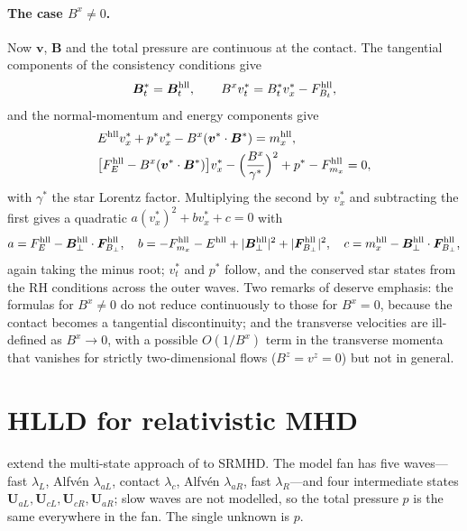 \documentclass[11pt,a4paper,oneside,openany]{book}
\newcommand{\textcite}{\citet}
\newcommand{\parencite}{\citep}
\theoremstyle{definition}
\theoremstyle{plain}
\theoremstyle{remark}
\newcommand{\vv}{\bm{v}}
\newcommand{\BB}{\bm{B}}
\newcommand{\UU}{\bm{U}}
\newcommand{\FF}{\bm{F}}
\begin{document}
\paragraph{The case $B^x\ne0$.} Now $\vv$, $\BB$ and the total pressure are continuous at the
contact. The tangential components of the consistency conditions give
\begin{equation}
\BB_t^\ast=\BB_t^{\rm hll},\qquad B^xv_t^\ast=B_t^\ast v_x^\ast-F^{\rm hll}_{B_t},
\end{equation}
and the normal-momentum and energy components give \parencite[eqs.~39--40]{MignoneBodo2006}
\begin{align}
&E^{\rm hll}v_x^\ast+p^\ast v_x^\ast-B^x(\vv^\ast\cdot\BB^\ast)=m_x^{\rm hll},\\
&\bigl[F^{\rm hll}_E-B^x(\vv^\ast\cdot\BB^\ast)\bigr]v_x^\ast-\Bigl(\frac{B^x}{\gamma^\ast}\Bigr)^2
+p^\ast-F^{\rm hll}_{m_x}=0, \label{eq:hllc-p}
\end{align}
with $\gamma^\ast$ the star Lorentz factor. Multiplying the second by $v_x^\ast$ and
subtracting the first gives a quadratic $a(v_x^\ast)^2+bv_x^\ast+c=0$ with
\begin{equation}
a=F^{\rm hll}_E-\BB^{\rm hll}_\perp\cdot\FF^{\rm hll}_{B_\perp},\quad
b=-F^{\rm hll}_{m_x}-E^{\rm hll}+|\BB^{\rm hll}_\perp|^2+|\FF^{\rm hll}_{B_\perp}|^2,\quad
c=m_x^{\rm hll}-\BB^{\rm hll}_\perp\cdot\FF^{\rm hll}_{B_\perp},
\end{equation}
again taking the minus root; $v_t^\ast$ and $p^\ast$ follow, and the conserved star states
from the RH conditions across the outer waves. Two remarks of \textcite{MignoneBodo2006}
deserve emphasis: the formulas for $B^x\ne0$ do not reduce continuously to those for $B^x=0$,
because the contact becomes a tangential discontinuity; and the transverse velocities are
ill-defined as $B^x\to0$, with a possible $O(1/B^x)$ term in the transverse momenta that
vanishes for strictly two-dimensional flows ($B^z=v^z=0$) but not in general.

\section{HLLD for relativistic MHD}\label{sec:hlld}

\textcite{MignoneUglianoBodo2009} extend the multi-state approach of
\textcite{MiyoshiKusano2005} to SRMHD. The model fan has five waves---fast $\lambda_L$,
Alfvén $\lambda_{aL}$, contact $\lambda_c$, Alfvén $\lambda_{aR}$, fast $\lambda_R$---and
four intermediate states $\UU_{aL},\UU_{cL},\UU_{cR},\UU_{aR}$; slow waves are not modelled,
so the total pressure $p$ is the same everywhere in the fan. The single unknown is $p$.
\end{document}
